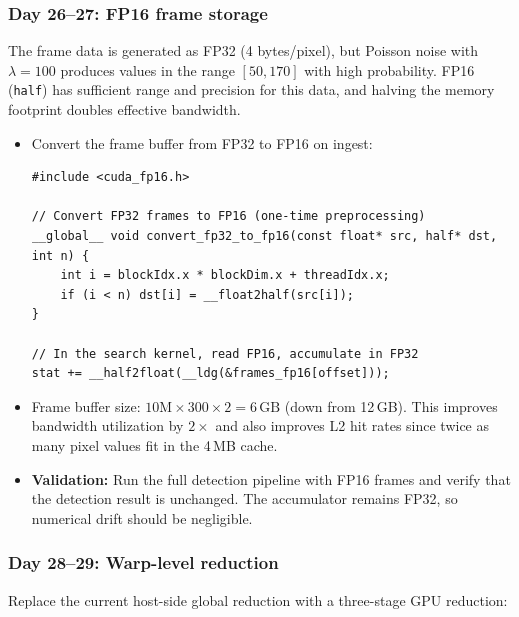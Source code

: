 \documentclass[11pt,letterpaper]{article}
\begin{document}
\subsubsection{Day 26--27: FP16 frame storage}

The frame data is generated as FP32 (4 bytes/pixel), but Poisson noise
with $\lambda = 100$ produces values in the range $[50, 170]$ with high
probability. FP16 (\texttt{half}) has sufficient range and precision for
this data, and halving the memory footprint doubles effective bandwidth.

\begin{itemize}[leftmargin=2em]
    \item Convert the frame buffer from FP32 to FP16 on ingest:

\begin{lstlisting}[style=cudastyle]
#include <cuda_fp16.h>

// Convert FP32 frames to FP16 (one-time preprocessing)
__global__ void convert_fp32_to_fp16(const float* src, half* dst, int n) {
    int i = blockIdx.x * blockDim.x + threadIdx.x;
    if (i < n) dst[i] = __float2half(src[i]);
}

// In the search kernel, read FP16, accumulate in FP32
stat += __half2float(__ldg(&frames_fp16[offset]));
\end{lstlisting}

    \item Frame buffer size: $10\text{M} \times 300 \times 2 = 6\,\text{GB}$
    (down from 12\,GB). This improves bandwidth utilization by $2\times$
    and also improves L2 hit rates since twice as many pixel values fit in
    the 4\,MB cache.

    \item \textbf{Validation:} Run the full detection pipeline with FP16
    frames and verify that the detection result is unchanged. The
    accumulator remains FP32, so numerical drift should be negligible.
\end{itemize}

\subsubsection{Day 28--29: Warp-level reduction}

Replace the current host-side global reduction with a three-stage
GPU reduction:
\end{document}

